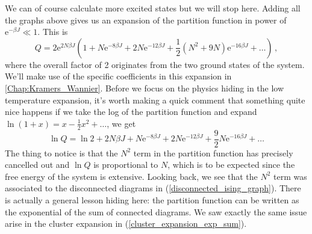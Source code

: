 \documentclass{article}
\theoremstyle{plain}\theoremheaderfont{\normalfont\bfseries}\theorembodyfont{\rmfamily}\theoremseparator{.}\newtheorem*{thm}{Theorem}\newtheorem*{law}{Law}\newtheorem*{pos}{Postulate}
\numberwithin{equation}{section}
\newcommand{\ee}{\mathrm{e}}
\begin{document}
    We can of course calculate more excited states but we will stop here. Adding all the graphs above gives us an expansion of the partition function in power of \(\ee^{-\beta J}\ll 1\). This is
    \begin{equation}\label{Ising_low_T_expansion}
        Q=2\ee^{2N\beta J}\left(1+N \ee^{-8\beta J}+2N\ee^{-12\beta J}+\frac{1}{2}(N^2+9N)\ee^{-16\beta J}+\dots\right)\,,
    \end{equation}
    where the overall factor of 2 originates from the two ground states of the system. We'll make use of the specific coefficients in this expansion in \cref{Chap:Kramers_Wannier}. Before we focus on the physics hiding in the low temperature expansion, it's worth making a quick comment that something quite nice happens if we take the log of the partition function and expand \(\ln(1+x)=x-\frac{1}{2}x^2+\dots\), we get
    \begin{equation}
        \ln Q = \ln 2+2N\beta J+N\ee^{-8\beta J}+2N\ee^{-12\beta J}+\frac{9}{2}N\ee^{-16\beta J}+\dots
    \end{equation}
    The thing to notice is that the \(N^2\) term in the partition function has precisely cancelled out and \(\ln Q\) is proportional to \(N\), which is to be expected since the free energy of the system is extensive. Looking back, we see that the \(N^2\) term was associated to the disconnected diagrams in (\ref{disconnected_ising_graph}). There is actually a general lesson hiding here: the partition function can be written as the exponential of the sum of connected diagrams. We saw exactly the same issue arise in the cluster expansion in (\ref{cluster_expansion_exp_sum}).
\end{document}
